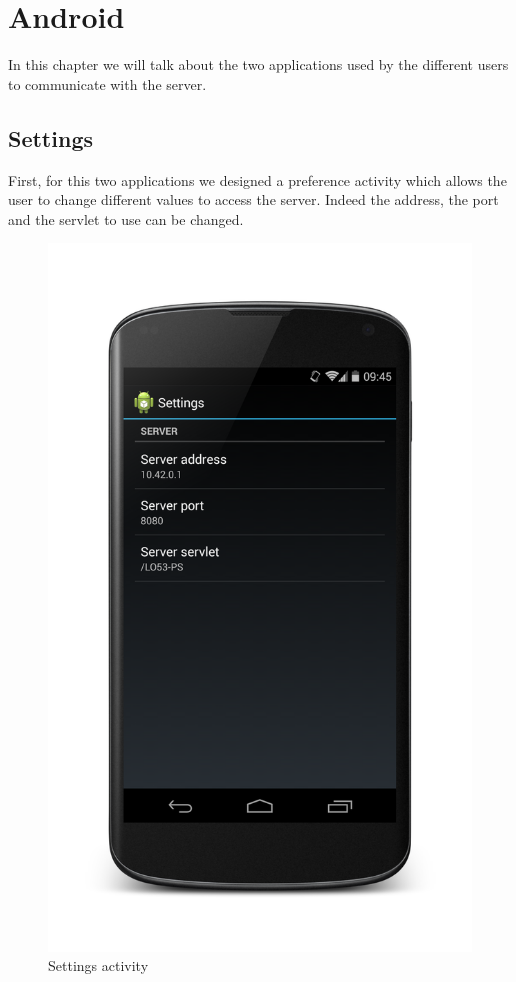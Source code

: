 \chapter{Android}
In this chapter we will talk about the two applications used by the different users to communicate with the server.

\section{Settings}
First, for this two applications we designed a preference activity which allows the user to change different values to access the server. Indeed the address, the port and the servlet to use can be changed.

\begin{figure}[h!]
  	\centering
    \includegraphics[scale=0.1]{./android/Settings.png}
  \caption{Settings activity}
\end{figure}


